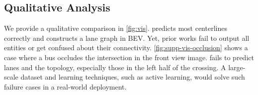 \subsection{Qualitative Analysis}


We provide a qualitative comparison in \cref{fig:vis}. \algname predicts most centerlines correctly and constructs a lane graph in BEV. Yet, prior works fail to output all entities or get confused about their connectivity. 
\cref{fig:supp-vis-occlusion} shows a case where a bus occludes the intersection in the front view image. 
\algname fails to predict lanes and the topology, especially those in the left half of the crossing. 
A large-scale dataset and learning techniques, such as active learning, would solve such failure cases in a real-world deployment.
